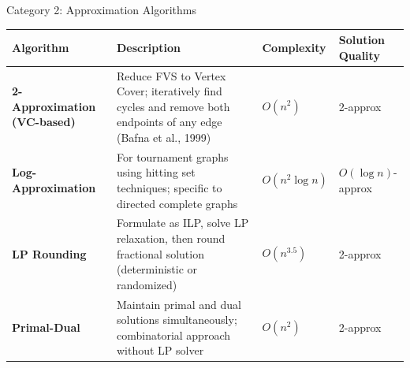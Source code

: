 \documentclass[aspectratio=169]{beamer}
\begin{document}
\begin{frame}{Category 2: Approximation Algorithms}
	\begin{table}
		\tiny
		\begin{tabular}{@{}p{3.5cm}p{5.5cm}p{2cm}p{1.8cm}@{}}
			\toprule
			\textbf{Algorithm}                                                                                             & \textbf{Description} & \textbf{Complexity} & \textbf{Solution Quality} \\
			\midrule

			\textbf{2-Approximation (VC-based)}                                                                            &
			Reduce FVS to Vertex Cover; iteratively find cycles and remove both endpoints of any edge (Bafna et al., 1999) &
			$O(n^2)$                                                                                                       &
			2-approx                                                                                                                                                                                \\
			\midrule

			\textbf{Log-Approximation}                                                                                     &
			For tournament graphs using hitting set techniques; specific to directed complete graphs                       &
			$O(n^2 \log n)$                                                                                                &
			$O(\log n)$-approx                                                                                                                                                                      \\
			\midrule

			\textbf{LP Rounding}                                                                                           &
			Formulate as ILP, solve LP relaxation, then round fractional solution (deterministic or randomized)            &
			$O(n^{3.5})$                                                                                                   &
			2-approx                                                                                                                                                                                \\
			\midrule

			\textbf{Primal-Dual}                                                                                           &
			Maintain primal and dual solutions simultaneously; combinatorial approach without LP solver                    &
			$O(n^2)$                                                                                                       &
			2-approx                                                                                                                                                                                \\
			\midrule


\end{tabular}
\end{table}
\end{frame}
\end{document}
